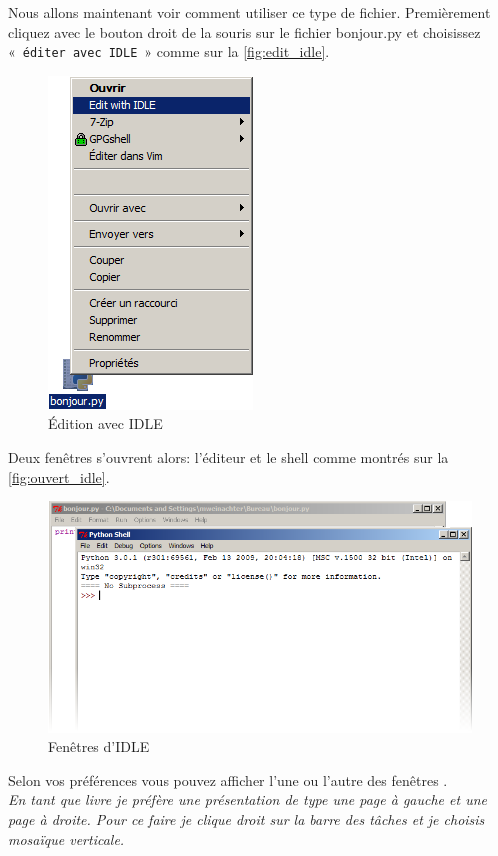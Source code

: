 Nous allons maintenant voir comment utiliser ce type de fichier.
Premièrement cliquez avec le bouton droit de la souris sur le fichier bonjour.py et choisissez « \texttt{éditer avec IDLE} » comme sur la \autoref{fig:edit_idle}.
\begin{figure}[h!]
\centering
\includegraphics[scale=0.5]{images/edit_idle.png} 
\caption{Édition avec IDLE}
\label{fig:edit_idle}
\end{figure}

Deux fenêtres s'ouvrent alors: l'éditeur et le shell comme montrés sur 
la \autoref{fig:ouvert_idle}.
\begin{figure}[h!]
\centering
\includegraphics[scale=0.5]{images/ouvert_idle.png} 
\caption{Fenêtres d'IDLE}
\label{fig:ouvert_idle}
\end{figure}

Selon vos préférences vous pouvez afficher l'une ou l'autre des fenêtres . \\

\emph{En tant que livre je préfère une présentation de type une page à gauche et
 une page à droite. Pour ce faire je clique droit sur la barre des tâches et je choisis mosaïque verticale.}\\

